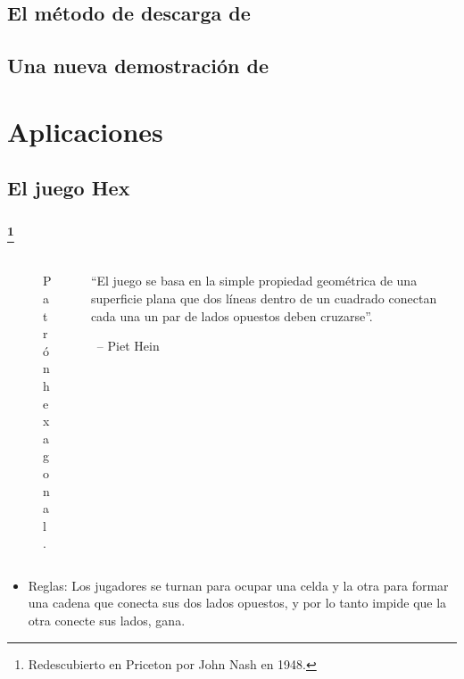 \documentclass[spanish, utf8,handout]{beamer} %
\theoremstyle{definition}
\begin{document}
\subsection{El método de descarga de \citeauthor{appel}}

\subsection{Una nueva demostración de \citeauthor{robertson}}

\section{Aplicaciones}

\subsection{El juego Hex}

\begin{frame}\transblindsvertical
\frametitle{\insertsubsection\footnote{Redescubierto en Priceton por John Nash en 1948.}}

\begin{columns}[t]
	\begin{column}{.4\textwidth}
			\begin{figure}[ht]
				\scalebox{.32}{}
				\caption{Patrón hexagonal.}
			\end{figure}%
	\end{column}
	\begin{column}{.38\textwidth}
		\begin{flushleft}
		``El juego se basa en la simple propiedad geométrica de una superficie plana que dos líneas dentro de un cuadrado conectan cada una un par de lados opuestos deben cruzarse''.
		\end{flushleft}
		\		
		-- Piet Hein
	\end{column}
\end{columns}

\vspace*{5pt}

\begin{itemize}
	\item Reglas: Los jugadores se turnan para ocupar una celda y la otra para formar una cadena que conecta sus dos lados opuestos, y por lo tanto impide que la otra conecte sus lados, gana.
\end{itemize}
\end{frame}
\end{document}
